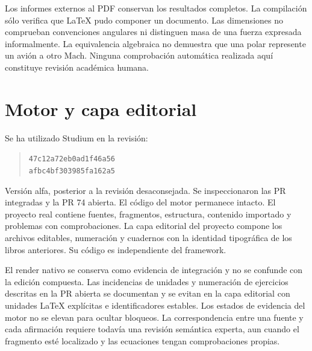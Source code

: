 Los informes externos al PDF conservan los resultados completos. La compilación sólo verifica que LaTeX pudo componer un documento. Las dimensiones no comprueban convenciones angulares ni distinguen masa de una fuerza expresada informalmente. La equivalencia algebraica no demuestra que una polar represente un avión a otro Mach. Ninguna comprobación automática realizada aquí constituye revisión académica humana.

\section{Motor y capa editorial}
Se ha utilizado Studium en la revisión:\begin{quote}\small\texttt{47c12a72eb0ad1f46a56}\\\texttt{afbc4bf303985fa162a5}\end{quote} Versión alfa, posterior a la revisión desaconsejada. Se inspeccionaron las PR integradas y la PR 74 abierta. El código del motor permanece intacto. El proyecto real contiene fuentes, fragmentos, estructura, contenido importado y problemas con comprobaciones. La capa editorial del proyecto compone los archivos editables, numeración y cuadernos con la identidad tipográfica de los libros anteriores. Su código es independiente del framework.

El render nativo se conserva como evidencia de integración y no se confunde con la edición compuesta. Las incidencias de unidades y numeración de ejercicios descritas en la PR abierta se documentan y se evitan en la capa editorial con unidades LaTeX explícitas e identificadores estables. Los estados de evidencia del motor no se elevan para ocultar bloqueos. La correspondencia entre una fuente y cada afirmación requiere todavía una revisión semántica experta, aun cuando el fragmento esté localizado y las ecuaciones tengan comprobaciones propias.
